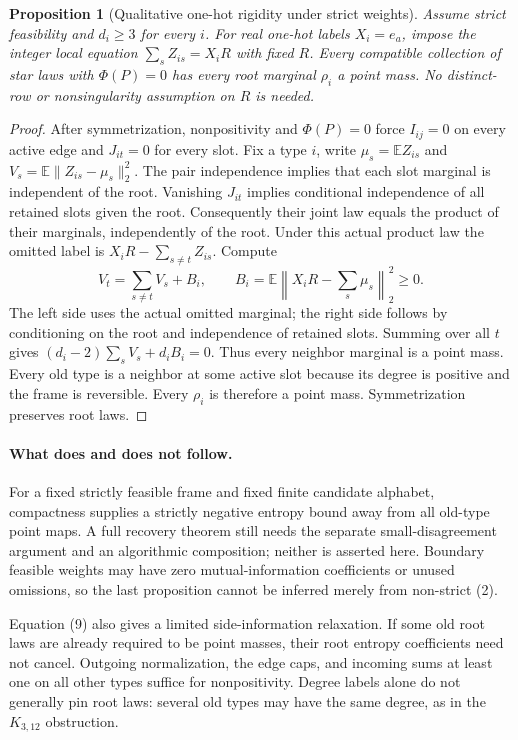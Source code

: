\documentclass[11pt]{article}
\newtheorem{proposition}{Proposition}
\newcommand{\E}{\mathbb E}
\begin{document}
\begin{proposition}[Qualitative one-hot rigidity under strict weights]
Assume strict feasibility and $d_i\geq3$ for every $i$. For real
one-hot labels $X_i=e_a$, impose the integer local equation
$\sum_s Z_{is}=X_iR$ with fixed $R$. Every compatible collection of
star laws with $\Phi(P)=0$ has every root marginal $\rho_i$ a point
mass. No distinct-row or nonsingularity assumption on $R$ is needed.
\end{proposition}
\begin{proof}
After symmetrization, nonpositivity and $\Phi(P)=0$ force
$I_{ij}=0$ on every active edge and $J_{it}=0$ for every slot.
Fix a type $i$, write $\mu_s=\E Z_{is}$ and
$V_s=\E\|Z_{is}-\mu_s\|_2^2$. The pair independence implies that
each slot marginal is independent of the root. Vanishing $J_{it}$
implies conditional independence of all retained slots given the root.
Consequently their joint law equals the product of their marginals,
independently of the root. Under this actual product law the omitted
label is $X_iR-\sum_{s\ne t}Z_{is}$. Compute
\[
 V_t=\sum_{s\ne t}V_s+B_i,
 \qquad B_i=\E\left\|X_iR-\sum_s\mu_s\right\|_2^2\geq0.
\]
The left side uses the actual omitted marginal; the right side follows
by conditioning on the root and independence of retained slots.
Summing over all $t$ gives
$(d_i-2)\sum_sV_s+d_iB_i=0$. Thus every neighbor marginal is a point
mass. Every old type is a neighbor at some active slot because its
degree is positive and the frame is reversible. Every $\rho_i$ is
therefore a point mass. Symmetrization preserves root laws.
\end{proof}

\paragraph{What does and does not follow.}
For a fixed strictly feasible frame and fixed finite candidate alphabet,
compactness supplies a strictly negative entropy bound away from all
old-type point maps. A full recovery theorem still needs the separate
small-disagreement argument and an algorithmic composition; neither is
asserted here. Boundary feasible weights may have zero mutual-information
coefficients or unused omissions, so the last proposition cannot be
inferred merely from non-strict (2).

Equation (9) also gives a limited side-information relaxation. If some
old root laws are already required to be point masses, their root
entropy coefficients need not cancel. Outgoing normalization, the edge
caps, and incoming sums at least one on all other types suffice for
nonpositivity. Degree labels alone do not generally pin root laws:
several old types may have the same degree, as in the $K_{3,12}$
obstruction.
\end{document}
